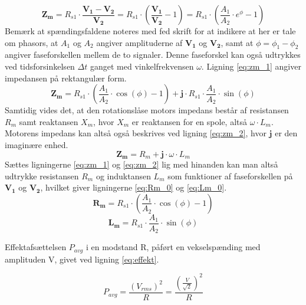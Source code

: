 \begin{equation}
	\mathbf{Z_m}=R_{s1}\cdot\frac{\mathbf{V_1}-\mathbf{V_2}}{\mathbf{V_2}}
			=R_{s1}\cdot\left(\frac{\mathbf{V_1}}{\mathbf{V_2}}-1\right)
			=R_{s1}\cdot\left(\frac{A_1}{A_2}\cdot{e}^{\phi}-1\right)
	\label{eq:zm_0} 
 \end{equation}
Bemærk at spændingsfaldene noteres med fed skrift for at indikere at her er tale om phasors,
at \(A_1\) og \(A_2\) angiver amplituderne af \(\mathbf{V_1}\) og \(\mathbf{V_2}\),
samt at \(\phi=\phi_1-\phi_2\) angiver faseforskellen mellem de to signaler.
Denne faseforskel kan også udtrykkes ved tidsforsinkelsen \(\Delta{t}\) ganget med vinkelfrekvensen \(\omega\).
Ligning \ref{eq:zm_1} angiver impedansen på rektangulær form.
\begin{equation}
	\mathbf{Z_m}=R_{s1}\cdot\left(\frac{A_1}{A_2}\cdot{\cos (\phi)}-1\right)	%
	+\mathbf{j}\cdot{R_{s1}}\cdot\frac{A_1}{A_2}\cdot\sin(\phi)	%
	\label{eq:zm_1} 
 \end{equation}
Samtidig vides det, at den rotationslåse motors impedans består af resistansen \(R_m\) samt
reaktansen \(X_m\), hvor \(X_m\) er reaktansen for en spole, altså \(\omega\cdot{L_m}\).
Motorens impedans kan altså også beskrives ved ligning \ref{eq:zm_2}, hvor \(\mathbf{j}\) er den imaginære enhed.
\begin{equation}
	\mathbf{Z_m}=R_m+\mathbf{j}\cdot\omega\cdot{L_m}
	\label{eq:zm_2} 
 \end{equation}
Sættes ligningerne \ref{eq:zm_1} og \ref{eq:zm_2} lig med hinanden
kan man altså udtrykke resistansen \(R_m\) og induktansen \(L_m\) som funktioner
af faseforskellen på \(\mathbf{V_1}\) og \(\mathbf{V_2}\),
hvilket giver ligningerne \ref{eq:Rm_0} og \ref{eq:Lm_0}.
\begin{equation}
	\mathbf{R_m}=R_{s1}\cdot\left(\frac{A_1}{A_2}\cdot{\cos (\phi)}-1\right)
	\label{eq:Rm_0} 
 \end{equation}
\begin{equation}
	\mathbf{L_m}=R_{s1}\cdot\frac{A_1}{A_2}\cdot\sin(\phi)
	\label{eq:Lm_0} 
 \end{equation}

Effektafsættelsen \(P_{avg}\) i en modstand R, påført en vekselspænding med amplituden V, givet ved ligning \ref{eq:effekt}.

\begin{equation}
	P_{avg}=\frac{\left(V_{rms}\right)^2}{R}=\frac{\left(\frac{V}{\sqrt{2}}\right)^2}{R}
	\label{eq:effekt}
 \end{equation}
